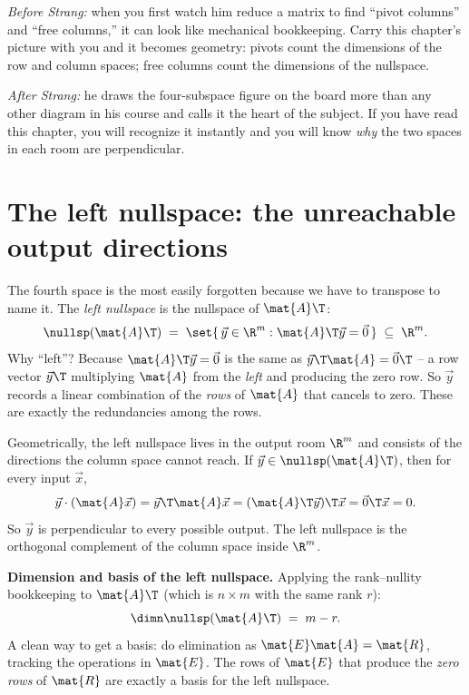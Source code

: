 \begin{strangbox}
\emph{Before Strang:} when you first watch him reduce a matrix to find ``pivot columns'' and
``free columns,'' it can look like mechanical bookkeeping. Carry this chapter's picture with you
and it becomes geometry: pivots count the dimensions of the row and column spaces; free columns
count the dimensions of the nullspace.

\emph{After Strang:} he draws the four-subspace figure on the board more than any other diagram
in his course and calls it the heart of the subject. If you have read this chapter, you will
recognize it instantly and you will know \emph{why} the two spaces in each room are perpendicular.
\end{strangbox}

\section{The left nullspace: the unreachable output directions}

The fourth space is the most easily forgotten because we have to transpose to name it. The
\emph{left nullspace} is the nullspace of $\mat{A}\T$:
\[
  \nullsp(\mat{A}\T) \;=\; \set{\,\vec{y}\in\R^m : \mat{A}\T\vec{y}=\vec{0}\,} \;\subseteq\; \R^m.
\]
Why ``left''? Because $\mat{A}\T\vec{y}=\vec{0}$ is the same as $\vec{y}\T\mat{A}=\vec{0}\T$ -- a
row vector $\vec{y}\T$ multiplying $\mat{A}$ from the \emph{left} and producing the zero row. So
$\vec{y}$ records a linear combination of the \emph{rows} of $\mat{A}$ that cancels to zero. These
are exactly the redundancies among the rows.

Geometrically, the left nullspace lives in the output room $\R^m$ and consists of the directions
the column space cannot reach. If $\vec{y}\in\nullsp(\mat{A}\T)$, then for every input $\vec{x}$,
\[
  \vec{y}\cdot(\mat{A}\vec{x}) = \vec{y}\T\mat{A}\vec{x} = (\mat{A}\T\vec{y})\T\vec{x}
  = \vec{0}\T\vec{x}=0.
\]
So $\vec{y}$ is perpendicular to every possible output. The left nullspace is the orthogonal
complement of the column space inside $\R^m$.

\begin{formalbox}
\textbf{Dimension and basis of the left nullspace.} Applying the rank--nullity bookkeeping to
$\mat{A}\T$ (which is $n\times m$ with the same rank $r$):
\[
  \dimn \nullsp(\mat{A}\T) \;=\; m - r.
\]
A clean way to get a basis: do elimination as $\mat{E}\mat{A}=\mat{R}$, tracking the operations
in $\mat{E}$. The rows of $\mat{E}$ that produce the \emph{zero rows} of $\mat{R}$ are exactly a
basis for the left nullspace.
\end{formalbox}

